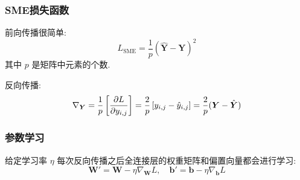 \subsubsection{SME损失函数}
前向传播很简单:
\[L_\mathrm{SME} = \frac{1}{p}(\hat{\boldsymbol{Y}} - \boldsymbol{Y})^2\]
其中 \(p\) 是矩阵中元素的个数.

反向传播:
\[\nabla_{\boldsymbol{Y}} = \frac{1}{p}\left[\frac{\partial L}{\partial y_{i,j}}\right] = 
\frac{2}{p}\left[y_{i,j} - \hat{y}_{i,j}\right] = \frac{2}{p}
(\boldsymbol{Y} - \hat{\boldsymbol{Y}})\]

\subsubsection{参数学习}
给定学习率 $\eta$ 每次反向传播之后全连接层的权重矩阵和偏置向量都会进行学习:
$$
\boldsymbol{W}' = \boldsymbol{W} - \eta \nabla_{\boldsymbol{W}} L, \quad \boldsymbol{b}' = \boldsymbol{b} - \eta \nabla_{\boldsymbol{b}} L
$$


